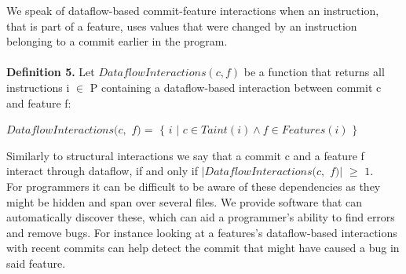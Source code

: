 We speak of dataflow-based commit-feature interactions when an instruction, that is part of a feature, uses values that were changed by an instruction belonging to a commit earlier in the program. \\ \\
\textbf{Definition 5.} Let $DataflowInteractions(c, f)$ be a function that returns all instructions i $\in$ P containing a dataflow-based interaction between commit c and feature f: 
\begin{center} $DataflowInteractions(c,$ $f) = $ $\{$ $i$ $|$ $ c \in Taint(i) \land f \in Features(i)$ $\}$ \end{center}
Similarly to structural interactions we say that a commit c and a feature f interact through dataflow, if and only if $|DataflowInteractions(c,$ $f)|$ $\geq$ $1$. \\
For programmers it can be difficult to be aware of these dependencies as they might be hidden and span over several files.
We provide software that can automatically discover these, which can aid a programmer's ability to find errors and remove bugs.
For instance looking at a features's dataflow-based interactions with recent commits can help detect the commit that might have caused a bug in said feature.
